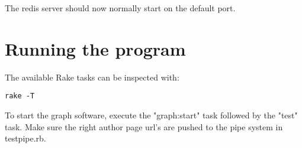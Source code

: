 The redis server should now normally start on the default port.

\section{Running the program}
The available Rake tasks can be inspected with:

\begin{verbatim}
rake -T
\end{verbatim}

To start the graph software, execute the "graph:start" task followed by the "test" task. Make sure the right author page url's are pushed to the pipe system in testpipe.rb.

\begin{verbatim}
\end{verbatim}